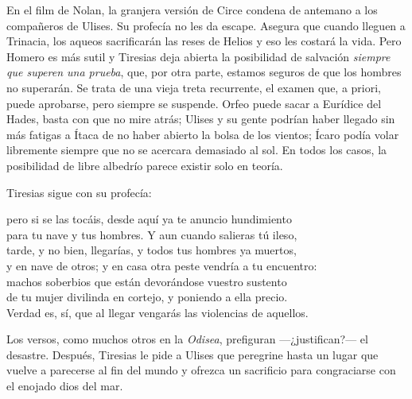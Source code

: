 En el film de Nolan, la granjera versión de Circe condena de antemano a los compañeros de Ulises. Su profecía no les da escape. Asegura que cuando lleguen a Trinacia, los aqueos sacrificarán las reses de Helios y eso les costará la vida. Pero Homero es más sutil y Tiresias deja abierta la posibilidad de salvación \emph{siempre que superen una prueba}, que, por otra parte, estamos seguros de que los hombres no superarán. Se trata de una vieja treta recurrente, el examen que, a priori, puede aprobarse, pero siempre se suspende. Orfeo puede sacar a Eurídice del Hades, basta con que no mire atrás; Ulises y su gente podrían haber llegado sin más fatigas a Ítaca de no haber abierto la bolsa de los vientos; Ícaro podía volar libremente siempre que no se acercara demasiado al sol. En todos los casos, la posibilidad de libre albedrío parece existir solo en teoría.

Tiresias sigue con su profecía:

\begin{versocita}
pero si se las tocáis, desde aquí ya te anuncio hundimiento\\
para tu nave y tus hombres. Y aun cuando salieras tú ileso,\\
tarde, y no bien, llegarías, y todos tus hombres ya muertos,\\
y en nave de otros; y en casa otra peste vendría a tu encuentro:\\
machos soberbios que están devorándose vuestro sustento\\
de tu mujer divilinda en cortejo, y poniendo a ella precio.\\
Verdad es, sí, que al llegar vengarás las violencias de aquellos.
\end{versocita}

Los versos, como muchos otros en la \emph{Odisea}, prefiguran ---¿justifican?--- el desastre. Después, Tiresias le pide a Ulises que peregrine hasta un lugar que vuelve a parecerse al fin del mundo y ofrezca un sacrificio para congraciarse con el enojado dios del mar.

